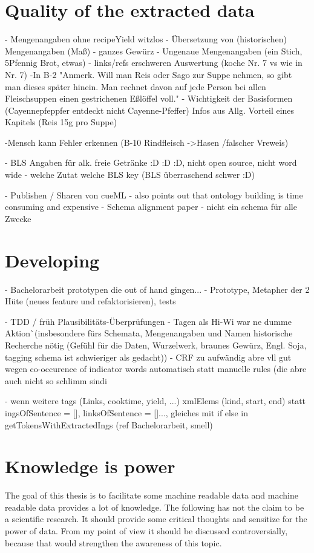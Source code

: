 \documentclass[12pt, twoside]{report}
\begin{document}
\section{Quality of the extracted data}
- Mengenangaben ohne recipeYield witzlos
- Übersetzung von (historischen) Mengenangaben (Maß)
- ganzes Gewürz
- Ungenaue Mengenangaben (ein Stich, 5Pfennig Brot, etwas)
- links/refs erschweren Auswertung (koche Nr. 7 vs wie in Nr. 7)
-In B-2 "Anmerk. Will man Reis oder Sago zur Suppe nehmen, so gibt man dieses später
hinein. Man rechnet davon auf jede Person bei allen Fleischsuppen einen gestrichenen Eßlöffel voll."
- Wichtigkeit der Basisformen (Cayennepfeppfer entdeckt nicht Cayenne-Pfeffer)
Infos aus Allg. Vorteil eines Kapitels (Reis 15g pro Suppe)

-Mensch kann Fehler erkennen (B-10 Rindfleisch ->Hasen /falscher Vreweis)

- BLS Angaben für alk. freie Getränke :D :D :D, nicht open source, nicht word wide
- welche Zutat welche BLS key (BLS überraschend schwer :D)

- Publishen / Sharen von cueML
	- \parencite{GrammaBased} also points out that ontology building is time consuming and expensive
	- Schema alignment paper - nicht ein schema für alle Zwecke

\section{Developing}
- Bachelorarbeit prototypen die out of hand gingen...
- Prototype, Metapher der 2 Hüte (neues feature und refaktorisieren), tests

- TDD / früh Plausibilitäts-Überprüfungen - Tagen als Hi-Wi war ne dumme Aktion^^ (insbesondere fürs Schemata, Mengenangaben und Namen historische Recherche nötig (Gefühl für die Daten, Wurzelwerk, braunes Gewürz,	Engl. Soja, tagging schema ist schwieriger als gedacht))
- CRF zu aufwändig abre vll gut wegen co-occurence of indicator words automatisch statt manuelle rules (die abre auch nicht so schlimm sind^^)

- wenn weitere tags (Links, cooktime, yield, ...) xmlElems (kind, start, end) statt ingsOfSentence = [], linksOfSentence = []..., gleiches mit if else in getTokensWithExtractedIngs (ref Bachelorarbeit, smell)

\section{Knowledge is power}
The goal of this thesis is to facilitate some machine readable data and machine readable data provides a lot of knowledge. The following has not the claim to be a scientific research. It should provide some critical thoughts and sensitize for the power of data. From my point of view it should be discussed controversially, because that would strengthen the awareness of this topic.
\end{document}

